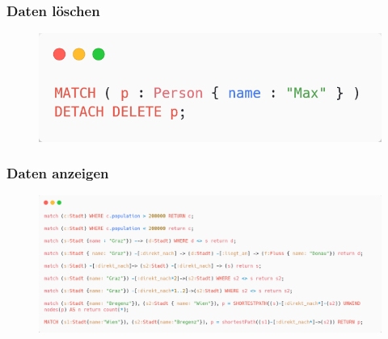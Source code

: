 \subsubsection{Daten löschen}
\begin{figure}[H]
    \centering
    \includegraphics[scale=.3]{res/themenkorb_8/cypher_delete.png}
\end{figure}
\subsubsection{Daten anzeigen}
\begin{figure}[H]
    \centering
    \includegraphics[width=\textwidth]{res/themenkorb_8/cypher_view.png}
\end{figure}